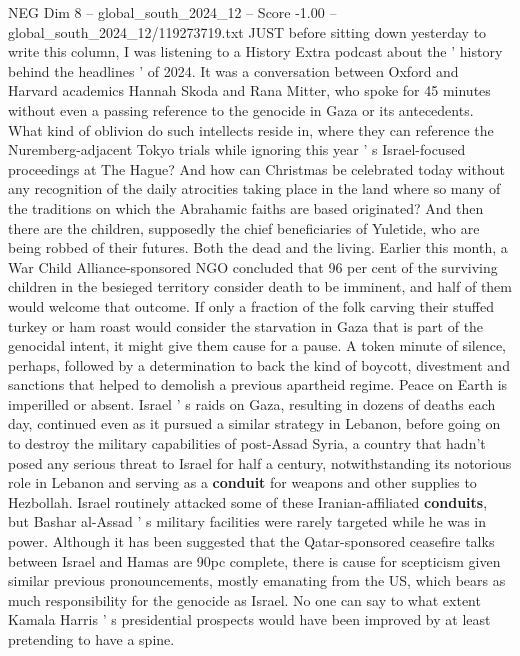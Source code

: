 \begin{textsample}{NEG Dim 8 – global\_south\_2024\_12 – Score -1.00 – global\_south\_2024\_12/119273719.txt}  \label{ex:f8_neg_385}
JUST before sitting down yesterday to write this column, I was listening to a History Extra podcast about the ' history behind the headlines ' of 2024.
It was a conversation between Oxford and Harvard academics Hannah Skoda and Rana Mitter, who spoke for 45 minutes without even a passing reference to the genocide in Gaza or its antecedents.
What kind of oblivion do such intellects reside in, where they can reference the Nuremberg-adjacent Tokyo trials while ignoring this year ' s Israel-focused proceedings at The Hague?
And how can Christmas be celebrated today without any recognition of the daily atrocities taking place in the land where so many of the traditions on which the Abrahamic faiths are based originated?
And then there are the children, supposedly the chief beneficiaries of Yuletide, who are being robbed of their futures.
Both the dead and the living.
Earlier this month, a War Child Alliance-sponsored NGO concluded that 96 per cent of the surviving children in the besieged territory consider death to be imminent, and half of them would welcome that outcome.
If only a fraction of the folk carving their stuffed turkey or ham roast would consider the starvation in Gaza that is part of the genocidal intent, it might give them cause for a pause.
A token minute of silence, perhaps, followed by a determination to back the kind of boycott, divestment and sanctions that helped to demolish a previous apartheid regime.
Peace on Earth is imperilled or absent.
Israel ' s raids on Gaza, resulting in dozens of deaths each day, continued even as it pursued a similar strategy in Lebanon, before going on to destroy the military capabilities of post-Assad Syria, a country that hadn't posed any serious threat to Israel for half a century, notwithstanding its notorious role in Lebanon and serving as a \textbf{conduit} for weapons and other supplies to Hezbollah.
Israel routinely attacked some of these Iranian-affiliated \textbf{conduits}, but Bashar al-Assad ' s military facilities were rarely targeted while he was in power.
Although it has been suggested that the Qatar-sponsored ceasefire talks between Israel and Hamas are 90pc complete, there is cause for scepticism given similar previous pronouncements, mostly emanating from the US, which bears as much responsibility for the genocide as Israel.
No one can say to what extent Kamala Harris ' s presidential prospects would have been improved by at least pretending to have a spine.

\end{textsample}
